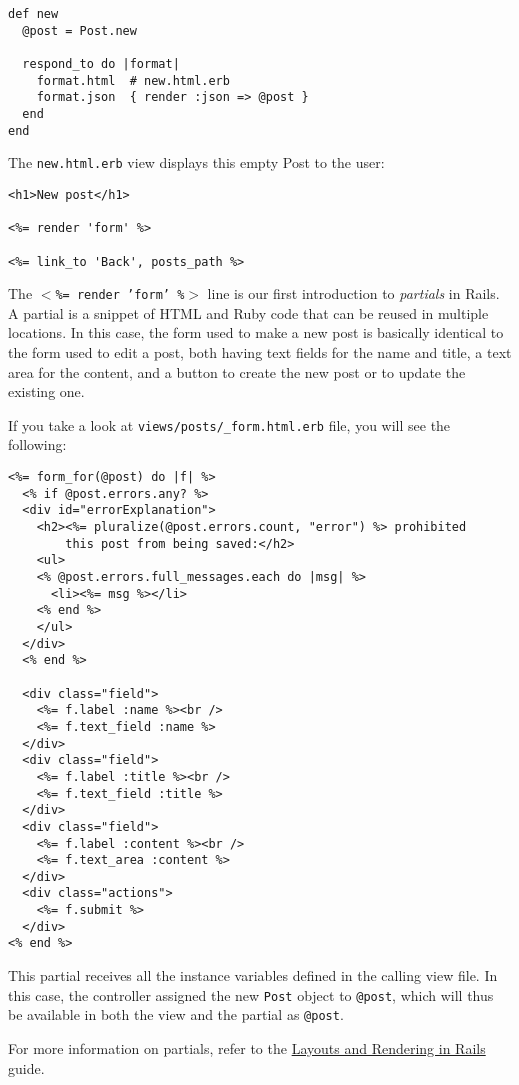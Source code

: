 \documentclass[10pt]{book}
\begin{document}
\begin{verbatim}
def new
  @post = Post.new
 
  respond_to do |format|
    format.html  # new.html.erb
    format.json  { render :json => @post }
  end
end
\end{verbatim}

The \texttt{new.html.erb} view displays this empty Post to the user:


\begin{verbatim}
<h1>New post</h1>
 
<%= render 'form' %>
 
<%= link_to 'Back', posts_path %>
\end{verbatim}

The \texttt{$<$\%= render 'form' \%$>$} line is our first introduction to \emph{partials} in Rails. A partial is a snippet of HTML and Ruby code that can be reused in multiple locations. In this case, the form used to make a new post is basically identical to the form used to edit a post, both having text fields for the name and title, a text area for the content, and a button to create the new post or to update the existing one.

If you take a look at \texttt{views/posts/\_form.html.erb} file, you will see the following:
\begin{verbatim}
<%= form_for(@post) do |f| %>
  <% if @post.errors.any? %>
  <div id="errorExplanation">
    <h2><%= pluralize(@post.errors.count, "error") %> prohibited
        this post from being saved:</h2>
    <ul>
    <% @post.errors.full_messages.each do |msg| %>
      <li><%= msg %></li>
    <% end %>
    </ul>
  </div>
  <% end %>
 
  <div class="field">
    <%= f.label :name %><br />
    <%= f.text_field :name %>
  </div>
  <div class="field">
    <%= f.label :title %><br />
    <%= f.text_field :title %>
  </div>
  <div class="field">
    <%= f.label :content %><br />
    <%= f.text_area :content %>
  </div>
  <div class="actions">
    <%= f.submit %>
  </div>
<% end %>
\end{verbatim}

This partial receives all the instance variables defined in the calling view file. In this case, the controller assigned the new \texttt{Post} object to \texttt{@post}, which will thus be available in both the view and the partial as \texttt{@post}.

For more information on partials, refer to the \href{http://guides.rubyonrails.org/layouts_and_rendering.html#using-partials}{Layouts and Rendering in Rails} guide.
\end{document}
